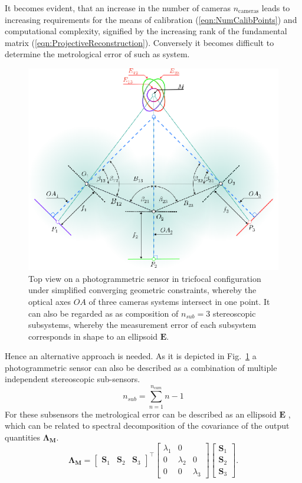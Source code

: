 \documentclass[5p,times,procedia]{elsarticle}
\begin{document}
It becomes evident, that an increase in the number of cameras $n_{\text{cameras}}$ leads to increasing requirements for the means of calibration (\ref{eqn:NumCalibPoints}) and computational complexity, signified by the increasing rank of the fundamental matrix (\ref{eqn:ProjectiveReconstruction}). Conversely it becomes difficult to determine the metrological error of such as system.\\
%
\begin{figure}[h]
	\centering
	\includegraphics[width=0.8\linewidth]{graphics/MixedErrorCuttingGeometry.eps}
	\caption{Top view on a photogrammetric sensor in tricfocal configuration under simplified converging geometric constraints, whereby the optical axes $OA$ of three cameras systems intersect in one point.		
	It can also be regarded as as composition of $n_{sub}=3$ stereoscopic subsystems, whereby the measurement error of each subsystem corresponds in shape to an ellipsoid $\mathbf{E}$.}
	\label{fig:sub_sensors}
\end{figure}
%
Hence an alternative approach is needed. As it is depicted in  Fig.~\ref{fig:sub_sensors} a photogrammetric sensor can also be described as a combination of multiple independent stereoscopic sub-sensors.
%
\begin{equation}
	\label{eqn:CovarianceMatrix}
	n_{sub} = \sum_{n=1}^{n_{cam}}n-1
\end{equation}
%
For these subsensors the metrological error can be described as an ellipsoid $\mathbf{E}$ \cite{Luhmann2003}, which can be related to spectral decomposition of the covariance of the output quantities $\mathbf{\Lambda_{M}}$.
%
\begin{equation}
	\mathbf{\Lambda_{M}} =
	\begin{bmatrix}
		\mathbf{S}_1^{} & \mathbf{S}_2^{} & \mathbf{S}_3^{}
	\end{bmatrix}^{\top}
	\begin{bmatrix}
		\lambda_1^{} & 0 \\
		0 & \lambda_2^{} &  0 \\
		0 & 0 &  \lambda_3^{}
	\end{bmatrix}
	\begin{bmatrix}
		\mathbf{S}_1^{} \\
		\mathbf{S}_2^{} \\
		\mathbf{S}_3^{}
	\end{bmatrix}.
\end{equation}
\end{document}
